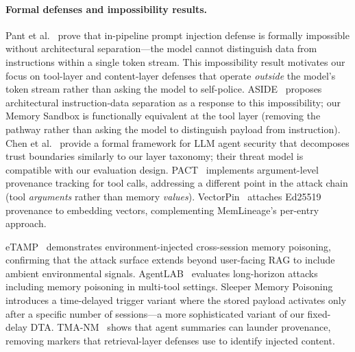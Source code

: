 

\paragraph{Formal defenses and impossibility results.}
Pant et al.~\citep{pant2026inseparability} prove that in-pipeline prompt injection defense is formally impossible without architectural separation---the model cannot distinguish data from instructions within a single token stream. This impossibility result motivates our focus on tool-layer and content-layer defenses that operate \emph{outside} the model's token stream rather than asking the model to self-police. ASIDE~\citep{aside2026} proposes architectural instruction-data separation as a response to this impossibility; our Memory Sandbox is functionally equivalent at the tool layer (removing the pathway rather than asking the model to distinguish payload from instruction). Chen et al.~\citep{chen2026formalizing} provide a formal framework for LLM agent security that decomposes trust boundaries similarly to our layer taxonomy; their threat model is compatible with our evaluation design. PACT~\citep{pact2026} implements argument-level provenance tracking for tool calls, addressing a different point in the attack chain (tool \emph{arguments} rather than memory \emph{values}). VectorPin~\citep{vectorpin2026} attaches Ed25519 provenance to embedding vectors, complementing MemLineage's per-entry approach.


eTAMP~\citep{etamp2026} demonstrates environment-injected cross-session memory poisoning, confirming that the attack surface extends beyond user-facing RAG to include ambient environmental signals. AgentLAB~\citep{agentlab2026} evaluates long-horizon attacks including memory poisoning in multi-tool settings. Sleeper Memory Poisoning~\citep{sleeper2026} introduces a time-delayed trigger variant where the stored payload activates only after a specific number of sessions---a more sophisticated variant of our fixed-delay DTA. TMA-NM~\citep{tma2026} shows that agent summaries can launder provenance, removing markers that retrieval-layer defenses use to identify injected content.

